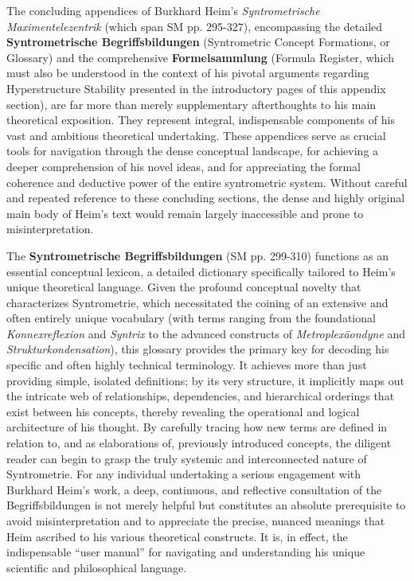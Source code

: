 \documentclass[
    12pt,              %
    a4paper,           %
    headings=normal,   %
    twoside=true,      %
    BCOR=8mm,          %
]{scrbook}
\begin{document}
The concluding appendices of Burkhard Heim's \textit{Syntrometrische Maximentelezentrik} (which span SM pp. 295-327), encompassing the detailed \textbf{Syntrometrische Begriffsbildungen} (Syntrometric Concept Formations, or Glossary) and the comprehensive \textbf{Formelsammlung} (Formula Register, which must also be understood in the context of his pivotal arguments regarding Hyperstructure Stability presented in the introductory pages of this appendix section), are far more than merely supplementary afterthoughts to his main theoretical exposition. They represent integral, indispensable components of his vast and ambitious theoretical undertaking. These appendices serve as crucial tools for navigation through the dense conceptual landscape, for achieving a deeper comprehension of his novel ideas, and for appreciating the formal coherence and deductive power of the entire syntrometric system. Without careful and repeated reference to these concluding sections, the dense and highly original main body of Heim's text would remain largely inaccessible and prone to misinterpretation.

The \textbf{Syntrometrische Begriffsbildungen} (SM pp. 299-310) functions as an essential conceptual lexicon, a detailed dictionary specifically tailored to Heim's unique theoretical language. Given the profound conceptual novelty that characterizes Syntrometrie, which necessitated the coining of an extensive and often entirely unique vocabulary (with terms ranging from the foundational \textit{Konnexreflexion} and \textit{Syntrix} to the advanced constructs of \textit{Metroplexäondyne} and \textit{Strukturkondensation}), this glossary provides the primary key for decoding his specific and often highly technical terminology. It achieves more than just providing simple, isolated definitions; by its very structure, it implicitly maps out the intricate web of relationships, dependencies, and hierarchical orderings that exist between his concepts, thereby revealing the operational and logical architecture of his thought. By carefully tracing how new terms are defined in relation to, and as elaborations of, previously introduced concepts, the diligent reader can begin to grasp the truly systemic and interconnected nature of Syntrometrie. For any individual undertaking a serious engagement with Burkhard Heim's work, a deep, continuous, and reflective consultation of the Begriffsbildungen is not merely helpful but constitutes an absolute prerequisite to avoid misinterpretation and to appreciate the precise, nuanced meanings that Heim ascribed to his various theoretical constructs. It is, in effect, the indispensable \enquote{user manual} for navigating and understanding his unique scientific and philosophical language.
\end{document}
